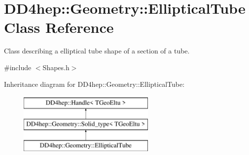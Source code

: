 \hypertarget{class_d_d4hep_1_1_geometry_1_1_elliptical_tube}{}\section{D\+D4hep\+:\+:Geometry\+:\+:Elliptical\+Tube Class Reference}
\label{class_d_d4hep_1_1_geometry_1_1_elliptical_tube}


Class describing a elliptical tube shape of a section of a tube.  




{\ttfamily \#include $<$Shapes.\+h$>$}

Inheritance diagram for D\+D4hep\+:\+:Geometry\+:\+:Elliptical\+Tube\+:\begin{figure}[H]
\begin{center}
\leavevmode
\includegraphics[height=3.000000cm]{class_d_d4hep_1_1_geometry_1_1_elliptical_tube}
\end{center}
\end{figure}
